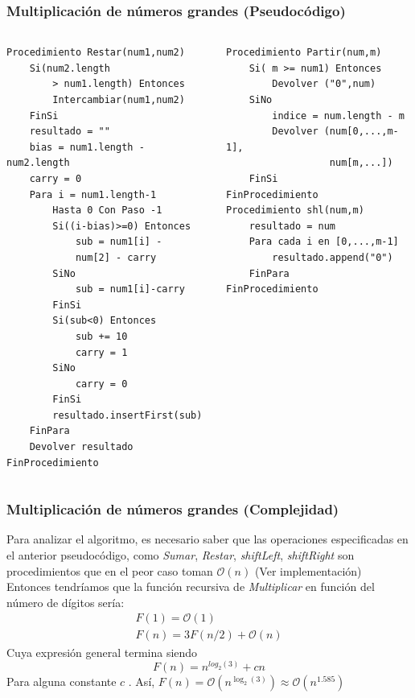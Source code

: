 \documentclass[10pt]{beamer}
\begin{document}
    \begin{frame}[fragile]
        \frametitle{Multiplicación de números grandes (Pseudocódigo)}
        \begin{columns}
            \begin{column}{0.50\textwidth}
                \begin{lstlisting}[basicstyle=\ttfamily\scriptsize]
Procedimiento Restar(num1,num2)
    Si(num2.length 
        > num1.length) Entonces
        Intercambiar(num1,num2)
    FinSi
    resultado = ""
    bias = num1.length - num2.length
    carry = 0
    Para i = num1.length-1 
        Hasta 0 Con Paso -1
        Si((i-bias)>=0) Entonces
            sub = num1[i] - 
            num[2] - carry
        SiNo
            sub = num1[i]-carry
        FinSi
        Si(sub<0) Entonces
            sub += 10
            carry = 1
        SiNo
            carry = 0
        FinSi
        resultado.insertFirst(sub)
    FinPara
    Devolver resultado
FinProcedimiento
                \end{lstlisting}
            \end{column}
            \begin{column}{0.50\textwidth}
                \begin{lstlisting}[basicstyle=\ttfamily\scriptsize]
Procedimiento Partir(num,m)
    Si( m >= num1) Entonces
        Devolver ("0",num)
    SiNo
        indice = num.length - m
        Devolver (num[0,...,m-1],
                  num[m,...])
    FinSi
FinProcedimiento
Procedimiento shl(num,m)
    resultado = num
    Para cada i en [0,...,m-1]
        resultado.append("0")
    FinPara
FinProcedimiento
                \end{lstlisting}
            \end{column}
        \end{columns}
    \end{frame}

    \begin{frame}
        \frametitle{Multiplicación de números grandes (Complejidad)}
        Para analizar el algoritmo, es necesario saber que las operaciones especificadas
        en el anterior pseudocódigo, como \textit{Sumar}, \textit{Restar}, \textit{shiftLeft}, \textit{shiftRight}
        son procedimientos que en el peor caso toman $\mathcal{O}(n)$ (Ver implementación) \\
        Entonces tendríamos que la función recursiva de \textit{Multiplicar} en función del número de dígitos sería:
        \begin{gather*}
            F(1) = \mathcal{O}(1) \\
            F(n) = 3F(n/2) + \mathcal{O}(n)
        \end{gather*}
        Cuya expresión general termina siendo
        \begin{equation*}
            F(n) = n^{log_2(3)} + cn
        \end{equation*}
        Para alguna constante $c$ . Así, $F(n) = \mathcal{O}(n^{\log_2(3)}) \approx \mathcal{O}(n^{1.585})$
    \end{frame}
    
\end{document}
